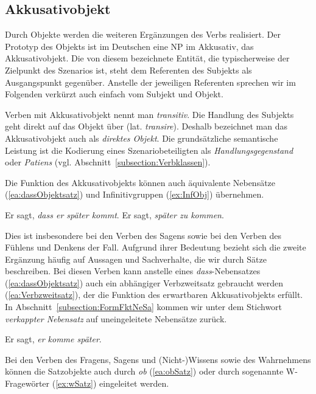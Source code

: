 \subsection{Akkusativobjekt}\label{subsection:Akkusativobj}

Durch Objekte werden die weiteren Ergänzungen des Verbs realisiert. Der Prototyp des Objekts ist im Deutschen eine NP im Akkusativ, das Akkusativobjekt. Die von diesem bezeichnete Entität, die typischerweise der Zielpunkt des Szenarios ist, steht dem Referenten des Subjekts als Ausgangspunkt gegenüber. Anstelle der jeweiligen Referenten sprechen wir im Folgenden verkürzt auch einfach vom Subjekt und Objekt.  

Verben mit Akkusativobjekt nennt man \textit{transitiv}. Die Handlung des Subjekts geht direkt auf das Objekt über (lat. \textit{transire}). Deshalb bezeichnet man das Akkusativobjekt auch als \textit{direktes Objekt}. Die grundsätzliche semantische Leistung ist die Kodierung eines Szenariobeteiligten als \textit{Handlungsgegenstand} oder \textit{Patiens} (vgl. Abschnitt~\ref{subsection:Verbklassen}).
 
Die Funktion des Akkusativobjekts können auch äquivalente Nebensätze (\ref{ea:dassObjektsatz}) und Infinitivgruppen (\ref{ex:InfObj}) übernehmen.

\ea \label{ea:AkkobjÄquivalente}
\ea \label{ea:dassObjektsatz} Er sagt, \textit{dass er später kommt}.
\ex \label{ex:InfObj} Er sagt, \textit{später zu kommen}.
\z 
\z 

Dies ist insbesondere bei den Verben des Sagens sowie bei den Verben des Fühlens und Denkens der Fall. Aufgrund ihrer Bedeutung bezieht sich die zweite Ergänzung häufig auf Aussagen und Sachverhalte, die wir durch Sätze beschreiben. Bei diesen Verben kann anstelle eines \textit{dass}-Nebensatzes (\ref{ea:dassObjektsatz}) auch ein abhängiger Verbzweitsatz gebraucht werden (\ref{ea:Verbzweitsatz}), der die Funktion des erwartbaren Akkusativobjekts erfüllt. In Abschnitt~\ref{subsection:FormFktNeSa} kommen wir unter dem Stichwort \textit{verkappter Nebensatz} auf uneingeleitete Nebensätze zurück. 

\ea \label{ea:Verbzweitsatz} Er sagt, \textit{er komme später}.
\z 

Bei den Verben des Fragens, Sagens und (Nicht-)Wissens sowie des Wahrnehmens können die Satzobjekte auch durch \textit{ob} (\ref{ea:obSatz}) oder durch sogenannte W-Fragewörter (\ref{ex:wSatz}) eingeleitet werden.  

